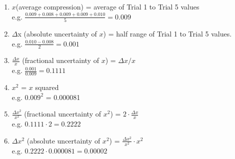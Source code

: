 \begin{enumerate}
    \item $x$(average compression) = average of Trial 1 to Trial 5 values \\
    e.g. $\frac{0.009 + 0.008 + 0.009 + 0.009 + 0.010}{5} = 0.009$
    \item $\Delta$x (absolute uncertainty of $x$) = half range of Trial 1 to Trial 5 values. \\
    e.g. $\frac{0.010 - 0.008}{2} = 0.001$
    \item $\frac{\Delta x}{x}$ (fractional uncertainty of $x$) = $\Delta{x} / {x}$\\
    e.g. $\frac{0.001}{0.009} = 0.1111$
    \item $x^2$ = $x$ squared \\
    e.g. $0.009^2$ = 0.000081
    \item $\frac{\Delta x^2}{x^2}$ (fractional uncertainty of $x^2$) = $2 \cdot \frac{\Delta x}{x}$ \\
    e.g. $0.1111\cdot 2 = 0.2222$
    \item $\Delta x^2$ (absolute uncertainty of $x^2$) = $\frac{\Delta x^2}{x^2} \cdot x^2$  \\
    e.g. $0.2222 \cdot 0.000081 = 0.00002 $
\end{enumerate}